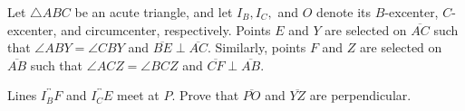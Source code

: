Let $\triangle ABC$ be an acute triangle, and let $I_B, I_C,$ and $O$ denote its $B$-excenter, $C$-excenter, and circumcenter, respectively.  Points $E$ and $Y$ are selected on $\overline{AC}$ such that $\angle ABY=\angle CBY$ and $\overline{BE}\perp\overline{AC}$.  Similarly, points $F$ and $Z$ are selected on $\overline{AB}$ such that $\angle ACZ=\angle BCZ$ and $\overline{CF}\perp\overline{AB}$.

Lines $\overleftrightarrow{I_BF}$ and $\overleftrightarrow{I_CE}$ meet at $P$.  Prove that $\overline{PO}$ and $\overline{YZ}$ are perpendicular.